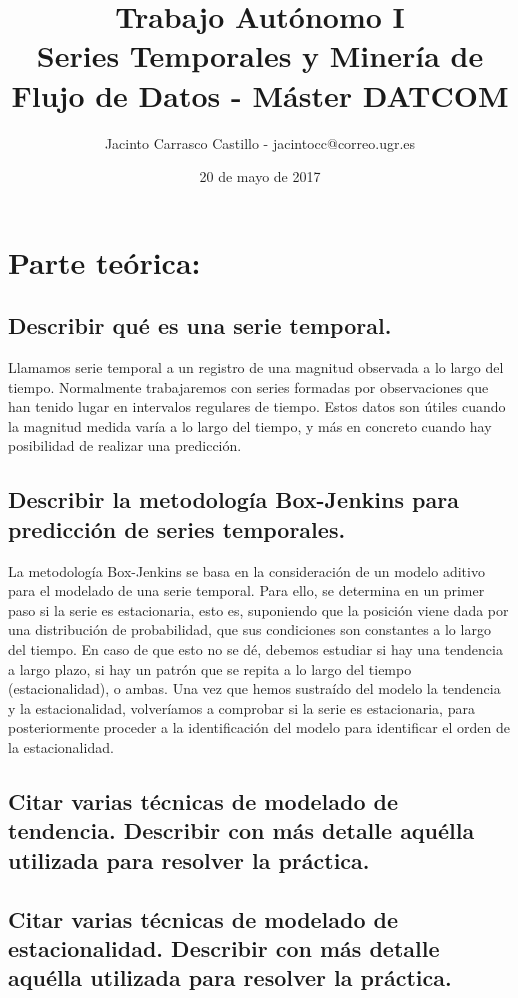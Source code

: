 \documentclass[11pt]{article}
\author{Jacinto Carrasco Castillo - jacintocc@correo.ugr.es}
\date{20 de mayo de 2017}
\title{Trabajo Autónomo I\\\medskip
\large Series Temporales y Minería de Flujo de Datos - Máster DATCOM}
\begin{document}
\maketitle


\section{Parte teórica:}
\label{sec:org2513b54}
\subsection{Describir qué es una serie temporal.}
\label{sec:org2efa813}

Llamamos serie temporal a un registro de una magnitud observada a lo
largo del tiempo. Normalmente trabajaremos con series formadas por
observaciones que han tenido lugar en intervalos regulares de
tiempo. Estos datos son útiles cuando la magnitud medida varía a lo
largo del tiempo, y más en concreto cuando hay posibilidad de realizar
una predicción.

\subsection{Describir la metodología Box-Jenkins para predicción de series temporales.}
\label{sec:orge796cd7}

La metodología Box-Jenkins se basa en la consideración de un modelo
aditivo para el modelado de una serie temporal. Para ello, se
determina en un primer paso si la serie es estacionaria, esto es,
suponiendo que la posición viene dada por una distribución de
probabilidad, que sus condiciones son constantes a lo largo del
tiempo. En caso de que esto no se dé, debemos estudiar si hay una
tendencia a largo plazo, si hay un patrón que se repita a lo largo del
tiempo (estacionalidad), o ambas. Una vez que hemos sustraído del
modelo la tendencia y la estacionalidad, volveríamos a comprobar si la
serie es estacionaria, para posteriormente proceder a la
identificación del modelo para identificar el orden de la estacionalidad.

\subsection{Citar varias técnicas de modelado de tendencia. Describir con más detalle aquélla utilizada para resolver la práctica.}
\label{sec:org3aca7f3}
\subsection{Citar varias técnicas de modelado de estacionalidad.  Describir con más detalle aquélla utilizada para resolver la práctica.}
\label{sec:org69d0c09}
\end{document}
